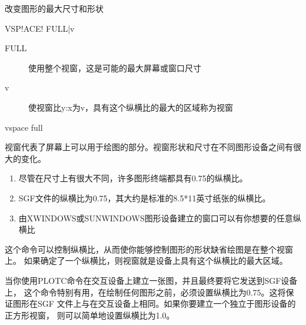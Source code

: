 \label{cmd:vspace}

改变图形的最大尺寸和形状

\begin{SACSTX}
VSP!ACE! FULL|v
\end{SACSTX}

\begin{description}
\item [FULL] 使用整个视窗，这是可能的最大屏幕或窗口尺寸 
\item [v] 使视窗比y:x为v，具有这个纵横比的最大的区域称为视窗 
\end{description}

\begin{SACDFT}
vspace full
\end{SACDFT}

视窗代表了屏幕上可以用于绘图的部分。视窗形状和尺寸在不同图形设备之间有很大的变化。
\begin{enumerate}
\item 尽管在尺寸上有很大不同，许多图形终端都具有0.75的纵横比。
\item SGF文件的纵横比为0.75，其大约是标准的8.5*11英寸纸张的纵横比。
\item  由XWINDOWS或SUNWINDOWS图形设备建立的窗口可以有你想要的任意纵横比
\end{enumerate}

这个命令可以控制纵横比，从而使你能够控制图形的形状缺省绘图是在整个视窗上。
如果确定了一个纵横比，则视窗就是设备上具有这个纵横比的最大区域。

当你使用PLOTC命令在交互设备上建立一张图，并且最终要将它发送到SGF设备上，
这个命令特别有用，在绘制任何图形之前，必须设置纵横比为0.75。这将保证图形在SGF
文件上与在交互设备上相同。如果你要建立一个独立于图形设备的正方形视窗，
则可以简单地设置纵横比为1.0。
